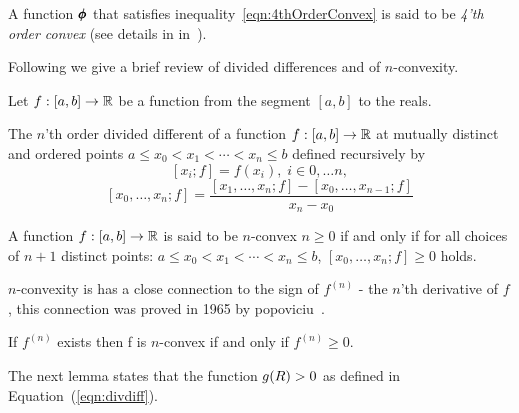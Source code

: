 \documentclass[anon,12pt]{colt2024} %
\begin{document}
A function $\pmb{\phi}_{}$ that satisfies
inequality~\ref{eqn:4thOrderConvex} is said to be {\em 4'th order convex}
(see details in in~\cite{butt2016generalization}).
\fi

Following\cite{butt2016generalization} we give a brief review of
divided differences and of $n$-convexity.

Let $f:[a,b] \to \mathbb{R}$ be a function from the segment $[a,b]$ to the
reals.

\begin{definition} \label{def:recurse-divided-difference}
  The $n$'th order divided different of a function $f:[a,b] \to
  \mathbb{R}$ at mutually distinct and ordered points $a \leq x_0 < x_1
  < \cdots < x_n \leq b$
  defined recursively by
  \[ [x_i; f] = f(x_i), \; i \in 0,\ldots n,\]
  \[ [x_0,\ldots,x_n;f] =
    \frac{[x_1,\ldots,x_n;f]-[x_0,\ldots,x_{n-1};f]}{x_n-x_0} \]
\end{definition}

\begin{definition}[$n$-convexity]
 A function $f:[a,b] \to \mathbb{R}$ is said to be $n$-convex  $n \geq 0$
 if and only if for all choices of $n+1$ distinct points: $a \leq x_0 < x_1
  < \cdots < x_n \leq b$, $[x_0,\ldots,x_n;f]\geq 0$ holds.
\end{definition}
$n$-convexity is has a close connection to the sign of $f^{(n)}$ - the $n$'th
derivative of $f$, this connection was proved in 1965 by
popoviciu~\cite{popoviciu1965certaines}.
\begin{theorem} \label{thm:popo}
If $f^{(n)}$ exists then f is $n$-convex if and only if $f^{(n)}\geq 0$.
\end{theorem}

The next lemma states that the function $g(R)>0$ as defined in
Equation~(\ref{eqn:divdiff}).
\end{document}
